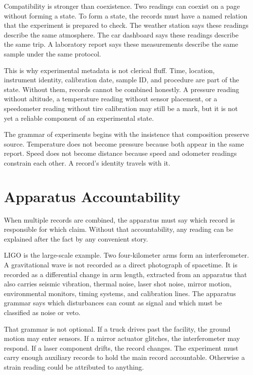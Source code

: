 Compatibility is stronger than coexistence. Two readings can coexist on a page
without forming a state. To form a state, the records must have a named relation
that the experiment is prepared to check. The weather station says these
readings describe the same atmosphere. The car dashboard says these readings
describe the same trip. A laboratory report says these measurements describe
the same sample under the same protocol.

This is why experimental metadata is not clerical fluff. Time, location,
instrument identity, calibration date, sample ID, and procedure are part of the
state. Without them, records cannot be combined honestly. A pressure reading
without altitude, a temperature reading without sensor placement, or a
speedometer reading without tire calibration may still be a mark, but it is not
yet a reliable component of an experimental state.

The grammar of experiments begins with the insistence that composition preserve
source. Temperature does not become pressure because both appear in the same
report. Speed does not become distance because speed and odometer readings
constrain each other. A record's identity travels with it.

\section{Apparatus Accountability}
\label{se:apparatus-accountability}

When multiple records are combined, the apparatus must say which record is
responsible for which claim. Without that accountability, any reading can be
explained after the fact by any convenient story.

LIGO is the large-scale example. Two four-kilometer arms form an interferometer.
A gravitational wave is not recorded as a direct photograph of spacetime. It is
recorded as a differential change in arm length, extracted from an apparatus
that also carries seismic vibration, thermal noise, laser shot noise, mirror
motion, environmental monitors, timing systems, and calibration lines. The
apparatus grammar says which disturbances can count as signal and which must be
classified as noise or veto.

That grammar is not optional. If a truck drives past the facility, the ground
motion may enter sensors. If a mirror actuator glitches, the interferometer may
respond. If a laser component drifts, the record changes. The experiment must
carry enough auxiliary records to hold the main record accountable. Otherwise a
strain reading could be attributed to anything.

